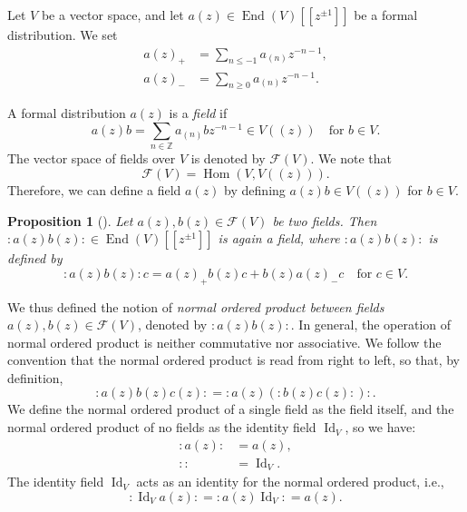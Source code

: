 \documentclass[a4paper, 12pt, reqno]{amsart}
\newtheorem{proposition}[theorem]{Proposition}
\theoremstyle{remark}
\DeclareMathOperator{\Hom}{Hom}
\DeclareMathOperator{\End}{End}
\DeclareMathOperator{\Id}{Id}
\begin{document}
Let $V$ be a vector space, and let $a(z) \in \End(V)[[z^{\pm1}]]$ be a formal distribution.
We set
\begin{align*}
  a(z)_+ &= \sum_{n \le -1}a_{(n)}z^{-n - 1}, \\
  a(z)_- &= \sum_{n \ge 0}a_{(n)}z^{-n - 1}.
\end{align*}

A formal distribution $a(z)$ is a \emph{field} if
\begin{equation*}
  a(z)b = \sum_{n \in \mathbb{Z}}a_{(n)}bz^{-n - 1} \in V((z)) \quad \text{for $b \in V$}.
\end{equation*}
The vector space of fields over $V$ is denoted by $\mathcal{F}(V)$.
We note that
\begin{equation*}
  \mathcal{F}(V) = \Hom(V, V((z))).
\end{equation*}
Therefore, we can define a field $a(z)$ by defining $a(z)b \in V((z))$ for $b \in V$.

\begin{proposition}[{\cite[Proposition 3.3.2]{nozaradan_introduction_2008}}]
  \label{prp:2}
  Let $a(z), b(z) \in \mathcal{F}(V)$ be two fields.
  Then $:a(z)b(z): \in \End(V)[[z^{\pm1}]]$ is again a field, where $:a(z)b(z):$ is defined by
  \begin{equation*}
    :a(z)b(z):c = a(z)_+b(z)c + b(z)a(z)_-c \quad \text{for $c \in V$}.
  \end{equation*}
\end{proposition}

We thus defined the notion of \emph{normal ordered product between fields $a(z), b(z) \in \mathcal{F}(V)$}, denoted by $:a(z)b(z):$.
In general, the operation of normal ordered product is neither commutative nor associative.
We follow the convention that the normal ordered product is read from right to left, so that, by definition,
\begin{equation*}
  :a(z)b(z)c(z): = :a(z)(:b(z)c(z):):.
\end{equation*}
We define the normal ordered product of a single field as the field itself, and the normal ordered product of no fields as the identity field $\Id_V$, so we have:
\begin{align*}
  :a(z): &= a(z), \\
  :: &= \Id_V.
\end{align*}
The identity field $\Id_V$ acts as an identity for the normal ordered product, i.e.,
\begin{equation*}
  :\Id_Va(z): = :a(z)\Id_V: = a(z).
\end{equation*}
\end{document}
